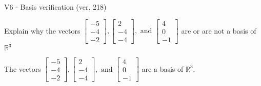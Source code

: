 \begin{exercise}
  \begin{exerciseTitle}V6 - Basis verification (ver. 218)\end{exerciseTitle}
  \begin{exerciseStatement}
    Explain why the vectors \(\left[\begin{array}{r}
-5 \\
-4 \\
-2
\end{array}\right] , \left[\begin{array}{r}
2 \\
-4 \\
-4
\end{array}\right] , \text{ and } \left[\begin{array}{r}
4 \\
0 \\
-1
\end{array}\right]\) are or are not a basis of \(\mathbb{R}^3\)	


  \end{exerciseStatement}
  \begin{exerciseAnswer}
   The vectors \(\left[\begin{array}{r}
-5 \\
-4 \\
-2
\end{array}\right] , \left[\begin{array}{r}
2 \\
-4 \\
-4
\end{array}\right] , \text{ and } \left[\begin{array}{r}
4 \\
0 \\
-1
\end{array}\right]\) 
  	 are  a basis of \(\mathbb{R}^3\).
  


  \end{exerciseAnswer}
\end{exercise}